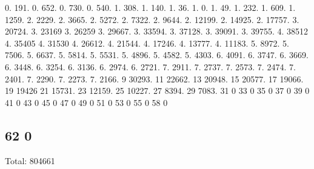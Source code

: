 0. 191. 0. 652. 0. 730. 0. 540. 1. 308. 1. 140. 1. 36. 1. 0. 1. 49. 1. 232. 1. 609. 1. 1259. 2. 2229. 2. 3665. 2. 5272. 2. 7322. 2. 9644. 2. 12199. 2. 14925. 2. 17757. 3. 20724. 3. 23169 3. 26259 3. 29667. 3. 33594. 3. 37128. 3. 39091. 3. 39755. 4. 38512 4. 35405 4. 31530 4. 26612. 4. 21544. 4. 17246. 4. 13777. 4. 11183. 5. 8972. 5. 7506. 5. 6637. 5. 5814. 5. 5531. 5. 4896. 5. 4582. 5. 4303. 6. 4091. 6. 3747. 6. 3669. 6. 3448. 6. 3254. 6. 3136. 6. 2974. 6. 2721. 7. 2911. 7. 2737. 7. 2573. 7. 2474. 7. 2401. 7. 2290. 7. 2273. 7. 2166. 9 30293. 11 22662. 13 20948. 15 20577. 17 19066. 19 19426 21 15731. 23 12159. 25 10227. 27 8394. 29 7083. 31 0 33 0 35 0 37 0 39 0 41 0 43 0 45 0 47 0 49 0 51 0 53 0 55 0 58 0 \subsection*{62 0 }

Total\+: 804661 